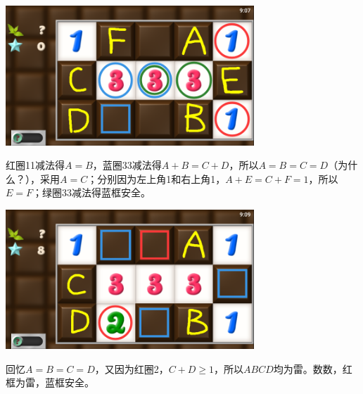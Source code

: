 \subsection{} %
\begin{center}
    \includegraphics[width=0.7\textwidth]{puzzle/116-1.png}
\end{center}
红圈11减法得$A=B$，蓝圈33减法得$A+B=C+D$，所以$A=B=C=D$（为什么？），采用$A=C$；分别因为左上角1和右上角1，$A+E=C+F=1$，所以$E=F$；绿圈33减法得蓝框安全。
\begin{center}
    \includegraphics[width=0.7\textwidth]{puzzle/116-2.png}
\end{center}
回忆$A=B=C=D$，又因为红圈2，$C+D\ge 1$，所以$ABCD$均为雷。数数，红框为雷，蓝框安全。


